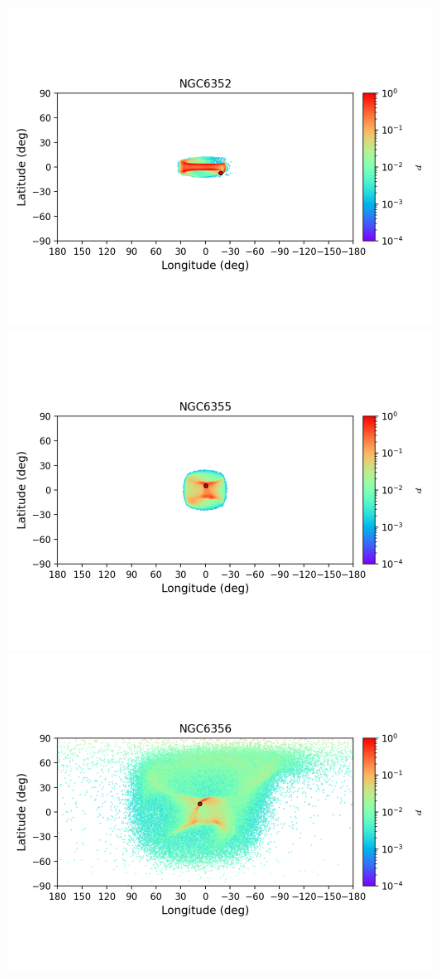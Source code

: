\begin{figure}
        \includegraphics[clip=true, trim = 0mm 20mm 0mm 10mm, width=1\columnwidth]{images/error_plots_NGC6352.png}
        \includegraphics[clip=true, trim = 0mm 20mm 0mm 10mm, width=1\columnwidth]{images/error_plots_NGC6355.png}
        \includegraphics[clip=true, trim = 0mm 20mm 0mm 10mm, width=1\columnwidth]{images/error_plots_NGC6356.png}

\end{figure}
